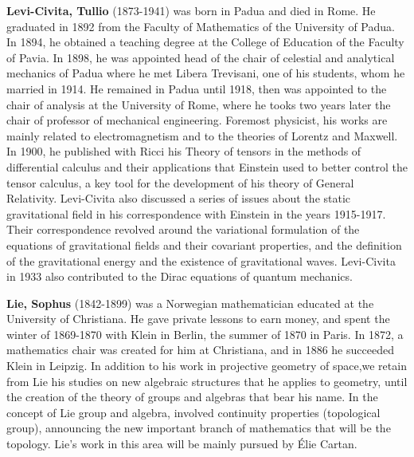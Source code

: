 \textbf{Levi-Civita, Tullio} (1873-1941) was born in Padua and died in Rome. He graduated in 1892 from the Faculty of Mathematics of the University of Padua. In 1894, he obtained a teaching degree at the College of Education of the Faculty of Pavia. In 1898, he was appointed head of the chair of celestial and analytical mechanics of Padua where he met Libera Trevisani, one of his students, whom he married in 1914. He remained in Padua until 1918, then was appointed to the chair of analysis at the University of Rome, where he tooks two years later the chair of professor of mechanical engineering. Foremost physicist, his works are mainly related to electromagnetism and to the theories of Lorentz and Maxwell. In 1900, he published with Ricci his Theory of tensors in the methods of differential calculus and their applications that Einstein used to better control the tensor calculus, a key tool for the development of his theory of General Relativity. Levi-Civita also discussed a series of issues about the static gravitational field in his correspondence with Einstein in the years 1915-1917. Their correspondence revolved around the variational formulation of the equations of gravitational fields and their covariant properties, and the definition of the gravitational energy and the existence of gravitational waves. Levi-Civita in 1933 also contributed to the Dirac equations of quantum mechanics.

\textbf{Lie, Sophus} (1842-1899) was a Norwegian mathematician educated at the University of Christiana. He gave private lessons to earn money, and spent the winter of 1869-1870 with Klein in Berlin, the summer of 1870 in Paris. In 1872, a mathematics chair was created for him at Christiana, and in 1886 he succeeded Klein in Leipzig. In addition to his work in projective geometry of space,we retain from Lie his studies on new algebraic structures that he applies to geometry, until the creation of the theory of groups and algebras that bear his name. In the concept of Lie group and algebra, involved continuity properties (topological group), announcing the new important branch of mathematics that will be the topology. Lie's work in this area will be mainly pursued by Élie Cartan.

